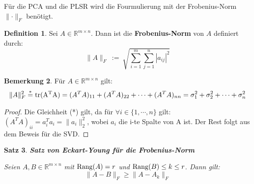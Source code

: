 \documentclass{article}
\newcommand{\R}[0]{\mathbb{R}}
\theoremstyle{plain}
\newtheorem{thm}{Satz}[section]
\theoremstyle{definition}
\newtheorem{defin}[thm]{Definition}
\newtheorem{bem}[thm]{Bemerkung}
\begin{document}
Für die PCA und die PLSR wird die Fourmulierung mit der Frobenius-Norm $\lVert \cdot \rVert_F$ benötigt.

\begin{defin}
    Sei $A \in \R^{m \times n}$. Dann ist die \textbf{Frobenius-Norm} von $A$ definiert durch:
    \begin{equation}
        \lVert A \rVert_F \: := \: \sqrt{\sum_{i=1}^{m}\sum_{j=1}^{n} |a_{ij}|^2}
    \end{equation}
\end{defin}

\begin{bem}
    Für $A \in \R^{m \times n}$ gilt:
    \begin{equation}
        \lVert A \rVert_F^2 \overset{*}{=} {\rm tr(A^TA)} = (A^TA)_{11} + (A^TA)_{22} + \cdots + (A^TA)_{nn} = \sigma_1^2 + \sigma_2^2 + \cdots + \sigma_n^2        
    \end{equation}
\end{bem}

\begin{proof} \cite[S. 73]{strang2019linear}
    Die Gleichheit (*) gilt, da für $\forall i\in \{1, \cdots, n\}$ gilt: $(A^TA)_{ii} = a_i^Ta_i = \lVert a_i \rVert^2_2$, wobei $a_i$ die i-te Spalte von A ist.
    Der Rest folgt aus dem Beweis für die SVD.
\end{proof}

\begin{thm} \textbf{Satz von Eckart-Young für die Frobenius-Norm}

    Seien $A, B \in \R^{m \times n}$ mit ${\rm Rang}(A) = r$ und ${\rm Rang}(B) \leq k \leq r$. Dann gilt:
    \begin{equation}
        \lVert A - B \rVert_F \geq \lVert A - A_k \rVert_F
    \end{equation}
\end{thm}
\end{document}
